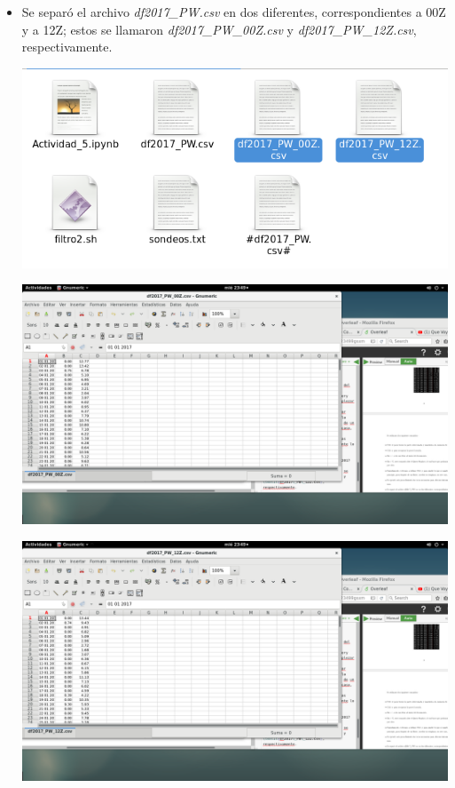 \documentclass{article}
\begin{document}
\begin{doublespace}
\begin{itemize}
\item Se separó el archivo \textit{df2017\_PW.csv} en dos diferentes, correspondientes a 00Z y a 12Z; estos se llamaron \textit{df2017\_PW\_00Z.csv} y \textit{df2017\_PW\_12Z.csv}, respectivamente.
\begin{center}
\includegraphics[scale=0.5]{act52.png}
\end{center}
\begin{center}
\includegraphics[scale=0.2]{act53.png}
\end{center}
\begin{center}
\includegraphics[scale=0.2]{act54.png}
\end{center}

\end{itemize}
\end{doublespace}
\end{document}
